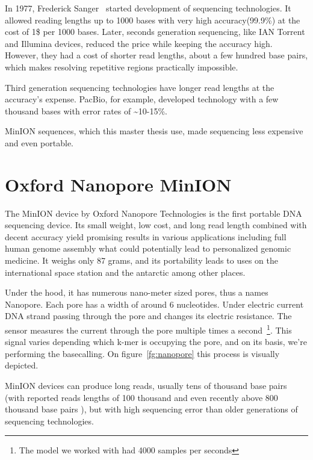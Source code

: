 \documentclass[times, utf8, diplomski, english]{fer}
\begin{document}
In 1977, Frederick Sanger~\citep{mile}\citep{Pettersson2009} started development of sequencing technologies. It allowed reading lengths up to 1000 bases with very high accuracy(99.9\%) at the cost of 1\$ per 1000 bases.
Later, seconds generation sequencing, like IAN Torrent and Illumina devices, reduced the price while keeping the accuracy high. However, they had a cost of shorter read lengths, about a few hundred base pairs, which makes resolving repetitive regions practically impossible.

Third generation sequencing technologies have longer read lengths at the accuracy's expense. PacBio, for example, developed technology with a few thousand bases with error rates of \textasciitilde10-15\%. 

MinION sequences, which this master thesis use, made sequencing less expensive and even portable.

\section{Oxford Nanopore MinION}

The MinION device by Oxford Nanopore Technologies is the first portable DNA sequencing device. Its small weight, low cost, and long read length combined with decent accuracy yield promising results in various applications including full human genome assembly \cite{human_seq} what could potentially lead to personalized genomic medicine. It weighs only 87 grams, and its portability leads to uses on the international space station and the antarctic among other places.

Under the hood, it has numerous nano-meter sized pores, thus a names Nanopore. Each pore has a width of around 6 nucleotides. Under electric current DNA strand passing through the pore and changes its electric resistance. The sensor measures the current through the pore multiple times a second~\footnote{The model we worked with had 4000 samples per seconds}. This signal varies depending which k-mer is occupying the pore, and on its basis, we're performing the basecalling. On figure~\ref{fg:nanopore} this process is visually depicted. 

MinION devices can produce long reads, usually tens of thousand base pairs (with reported reads lengths of 100 thousand \cite{loman1-100k} and even recently above 800 thousand base pairs \cite{loman2-800k}), but with high sequencing error than older generations of sequencing technologies.
\end{document}
